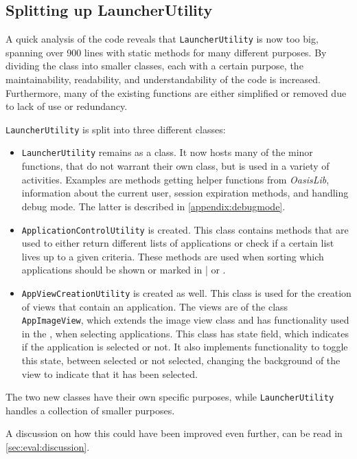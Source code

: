 \subsection{Splitting up LauncherUtility}\label{sect:sprint4:refactoring}

A quick analysis of the code reveals that \lstinline|LauncherUtility| is now too big, spanning over 900 lines with static methods for many different purposes.
By dividing the class into smaller classes, each with a certain purpose, the maintainability, readability, and understandability of the code is increased.
Furthermore, many of the existing functions are either simplified or removed due to lack of use or redundancy.

\lstinline|LauncherUtility| is split into three different classes:

\begin{itemize}
\item \lstinline|LauncherUtility| remains as a class.
It now hosts many of the minor functions, that do not warrant their own class, but is used in a variety of activities.
Examples are methods getting helper functions from \textit{OasisLib}, information about the current user, session expiration methods, and handling debug mode.
The latter is described in \cref{appendix:debugmode}.
\item \lstinline|ApplicationControlUtility| is created.
This class contains methods that are used to either return different lists of applications or check if a certain list lives up to a given criteria.
These methods are used when sorting which applications should be shown or marked in \settingsactivity| or \homeactivity.
\item \lstinline|AppViewCreationUtility| is created as well.
This class is used for the creation of views that contain an application.
The views are of the class \lstinline|AppImageView|, which extends the image view class and has functionality used in the \settingsactivity, when selecting applications. 
This class has state field, which indicates if the application is selected or not. 
It also implements functionality to toggle this state, between selected or not selected, changing the background of the view to indicate that it has been selected.
\end{itemize}

The two new classes have their own specific purposes, while \lstinline|LauncherUtility| handles a collection of smaller purposes.

A discussion on how this could have been improved even further, can be read in \cref{sec:eval:discussion}.